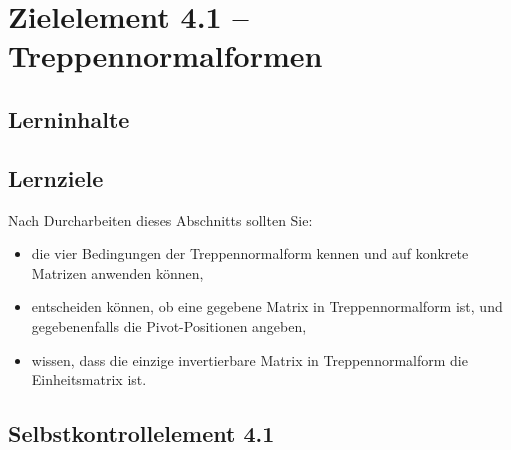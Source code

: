\documentclass[a4paper,12pt]{article}
\begin{document}
\newpage

\section*{Zielelement 4.1 -- Treppennormalformen}

\subsection*{Lerninhalte}

\begin{center}
\end{center}

\subsection*{Lernziele}

Nach Durcharbeiten dieses Abschnitts sollten Sie:
\begin{itemize}
  \item die vier Bedingungen der Treppennormalform kennen und auf konkrete Matrizen
        anwenden können,
  \item entscheiden können, ob eine gegebene Matrix in Treppennormalform ist,
        und gegebenenfalls die Pivot-Positionen angeben,
  \item wissen, dass die einzige invertierbare Matrix in Treppennormalform die
        Einheitsmatrix ist.
\end{itemize}

\subsection*{Selbstkontrollelement 4.1}
\end{document}
